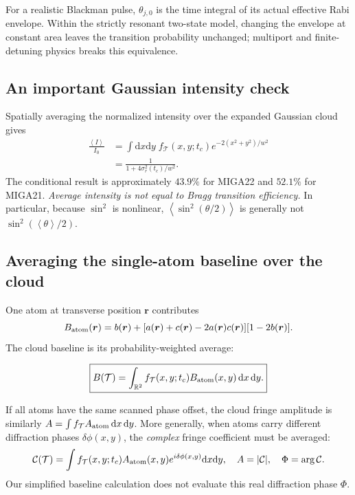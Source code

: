 \documentclass[11pt,a4paper]{article}
\numberwithin{equation}{section}
\newcommand{\Tat}{\mathcal{T}}
\newcommand{\dd}{\mathrm{d}}
\newcommand{\av}[1]{\left\langle #1\right\rangle}
\begin{document}
For a realistic Blackman pulse, $\theta_{j,0}$ is the time integral of its
actual effective Rabi envelope. Within the strictly resonant two-state model,
changing the envelope at constant area leaves the transition probability
unchanged; multiport and finite-detuning physics breaks this equivalence.

\subsection{An important Gaussian intensity check}

Spatially averaging the normalized intensity over the expanded Gaussian cloud
gives
\begin{align}
\frac{\av I}{I_0}
&=\int\dd x\dd y\;f_{\Tat}(x,y;t_c)e^{-2(x^2+y^2)/w^2}\\
&=\boxed{\frac{1}{1+4\sigma_r^2(t_c)/w^2}}.
\end{align}
The conditional result is approximately $43.9\%$ for MIGA22 and $52.1\%$
for MIGA21. \emph{Average intensity is not equal to Bragg transition efficiency.}
In particular, because $\sin^2$ is nonlinear,
$\av{\sin^2(\theta/2)}$ is generally not
$\sin^2(\av\theta/2)$.

\subsection{Averaging the single-atom baseline over the cloud}

One atom at transverse position $\bm r$ contributes
\begin{equation}
B_{\rm atom}(\bm r)=b(\bm r)+
 [a(\bm r)+c(\bm r)-2a(\bm r)c(\bm r)][1-2b(\bm r)].
\end{equation}
The cloud baseline is its probability-weighted average:
\begin{keybox}
\begin{equation}\label{eq:Bxy}
\boxed{B(\Tat)=\int_{\mathbb R^2} f_{\Tat}(x,y;t_c)
 B_{\rm atom}(x,y)\,\dd x\,\dd y.}
\end{equation}
\end{keybox}
If all atoms have the same scanned phase offset, the cloud fringe amplitude is
similarly $A=\int f_{\Tat} A_{\rm atom}\,\dd x\,\dd y$.
More generally, when atoms carry different diffraction phases
$\delta\phi(x,y)$, the \emph{complex} fringe coefficient must be averaged:
\begin{equation}\label{eq:complexharmonic}
\mathcal C(\Tat)=\int f_{\Tat}(x,y;t_c)A_{\rm atom}(x,y)
 e^{i\delta\phi(x,y)}\dd x\dd y,\quad
A=|\mathcal C|,\quad\Phi=\arg\mathcal C.
\end{equation}
Our simplified baseline calculation does not evaluate this real diffraction
phase $\Phi$.
\end{document}

